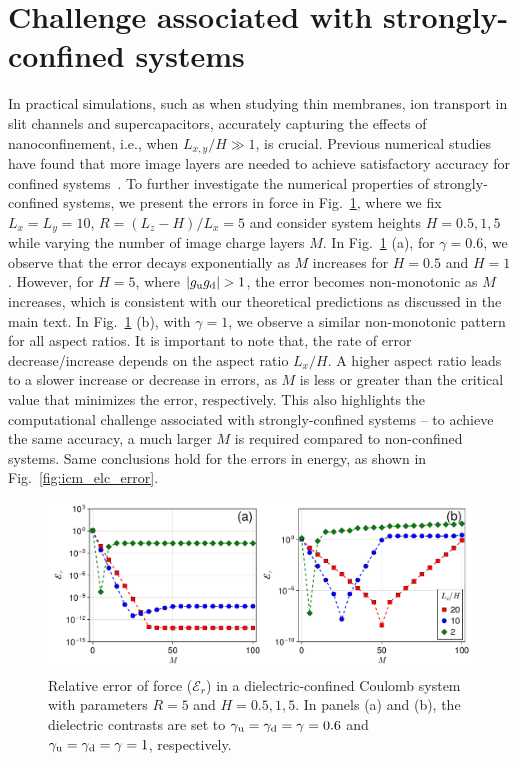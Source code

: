 \section{Challenge associated with strongly-confined systems}
In practical simulations, such as when studying thin membranes, ion transport in slit channels and supercapacitors, accurately capturing the effects of nanoconfinement, i.e., when $L_{x,y} / H\gg 1$, is crucial.
Previous numerical studies have found that more image layers are needed to achieve satisfactory accuracy for confined systems~\cite{dos2015electrolytes}. 
To further investigate the numerical properties of strongly-confined systems, we present the errors in force in Fig.~\ref{fig:icm_elc_error_force}, where we fix $L_x=L_y=10$, $R=(L_z-H)/L_x = 5$ and consider system heights $H = 0.5, 1, 5$ while varying the number of image charge layers $M$. 
In Fig.~\ref{fig:icm_elc_error_force} (a), for $\gamma = 0.6$, we observe that the error decays exponentially as $M$ increases for $H = 0.5$ and $H = 1$. 
However, for $H = 5$, where $|g_{\T u}g_{\T d}|>1$, the error becomes non-monotonic as $M$ increases, 
which is consistent with our theoretical predictions as discussed in the main text.
In Fig.~\ref{fig:icm_elc_error_force} (b), with $\gamma = 1$, we observe a similar non-monotonic pattern for all aspect ratios. 
It is important to note that, the rate of error decrease/increase depends on the aspect ratio $L_x/H$. 
A higher aspect ratio leads to a slower increase or decrease in errors, as $M$ is less or greater than the critical value that minimizes the error, respectively. 
This also highlights the computational challenge associated with strongly-confined systems -- to achieve the same accuracy, a much larger $M$ is required compared to non-confined systems.
Same conclusions hold for the errors in energy, as shown in Fig.~\ref{fig:icm_elc_error}.

\begin{figure}[htbp]
    \centering
    \includegraphics[width=0.98\linewidth]{figs/icm_elc_error_force.pdf}
    \caption{Relative error of force ($\mathcal{E}_r$) in a dielectric-confined Coulomb system with parameters $R = 5$ and $H = 0.5, 1, 5$. In panels (a) and (b), the dielectric contrasts are set to $\gamma_{\text{u}} = \gamma_{\text{d}} = \gamma = 0.6$ and $\gamma_{\text{u}} = \gamma_{\text{d}} = \gamma = 1$, respectively.}
    \label{fig:icm_elc_error_force}
\end{figure}

